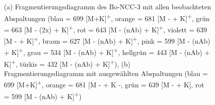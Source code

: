 \begin{figure}[!htbp]
  \caption[Fragmentierungsdiagramme des Reaktionsproduktes von Bo-DNCC, Quelle: Autor]{(a) Fragmentierungsdiagramm des Bo-NCC-3 mit allen beobachteten Abspaltungen (blau = 699 [M+K]\textsuperscript{+}, orange = 681 [M -  + K]\textsuperscript{+}, grün = 663 [M - (2x) + K]\textsuperscript{+}, rot = 643 [M - (\gls{nAb}) + K]\textsuperscript{+}, violett = 639 [M -  + K]\textsuperscript{+}, braun = 627 [M - (\gls{nAb}) + K]\textsuperscript{+}, pink = 599 [M - (\gls{nAb}) + K]\textsuperscript{+}, grau = 534 [M - (\gls{nAb}) + K]\textsuperscript{+}, hellgrün = 443 [M - (\gls{nAb}) + K]\textsuperscript{+}, türkis = 432 [M - (\gls{nAb}) + K]\textsuperscript{+}), (b) Fragmentierungsdiagramm mit ausgewählten Abspaltungen (blau = 699 [M+K]\textsuperscript{+}, orange = 681 [M -  + K -, grün = 639 [M -  + K], rot = 599 [M - (\gls{nAb}) + K]\textsuperscript{+})}
\end{figure}

